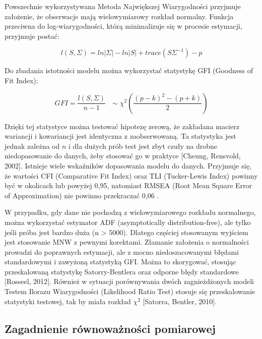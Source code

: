 \documentclass[12pt]{article}
\begin{document}
Powszechnie wykorzystywana Metoda Największej Wiarygodności przyjmuje założenie, że obserwacje mają wielowymiarowy rozkład normalny. Funkcja przeciwna do log-wiarygodności, którą minimalizuje się w procesie estymacji, przyjmuje postać:

\begin{equation}
\label{eq:loglikelihood}
l(S, \Sigma) = ln|\Sigma| - ln|S| + trace(S \Sigma^{-1}) - p
\end{equation}

Do zbadania istotności modelu można wykorzystać statystykę GFI (Goodness of Fit Index):

\begin{equation}
\label{eq:gfi}
GFI = \frac{l(S, \Sigma)}{n-1} \text{   } \sim \chi^2 (\frac{(p-k)^2 - (p+k)}{2})
\end{equation}

Dzięki tej statystyce można testować hipotezę zerową, że zakładana macierz wariancji i kowariancji jest identyczna z zaobserwowaną. Ta statystyka jest jednak zależna od \(n\) i dla dużych prób test jest zbyt czuły na drobne niedopasowanie do danych, żeby stosować go w praktyce {[}Cheung, Rensvold, 2002{]}. Istnieje wiele wskaźników dopasowania modelu do danych. Przyjmuje się, że wartości CFI (Comparative Fit Index) oraz TLI (Tucker-Lewis Index) powinny być w okolicach lub powyżej 0,95, natomiast RMSEA (Root Mean Square Error of Approximation) nie powinno przekraczać 0,06 \citep{HuBentler}.

W przypadku, gdy dane nie pochodzą z wielowymiarowego rozkładu normalnego, można wykorzystać estymator ADF (asymptotically distribution-free), ale tylko jeśli próba jest bardzo duża (n \textgreater{} 5000). Dlatego częściej stosowanym wyjściem jest stosowanie MNW z pewnymi korektami. Złamanie założenia o normalności prowadzi do poprawnych estymacji, ale z mocno niedoszacowanymi błędami standardowymi i zawyżoną statystyką GFI. Można to skorygować, stosując przeskalowaną statystykę Satorry-Bentlera oraz odporne błędy standardowe {[}Rosseel, 2012{]}. Również w sytuacji porównywania dwóch zagnieżdżonych modeli Testem Ilorazu Wiarygodności (Likelihood Ratio Test) stosuje się przeskalowanie statystyki testowej, tak by miała rozkład \(\chi^2\) {[}Satorra, Bentler, 2010{]}.

\hypertarget{zagadnienie-ruxf3wnowaux17cnoux15bci-pomiarowej}{%
\subsection{Zagadnienie równoważności pomiarowej}\label{zagadnienie-ruxf3wnowaux17cnoux15bci-pomiarowej}}
\end{document}
